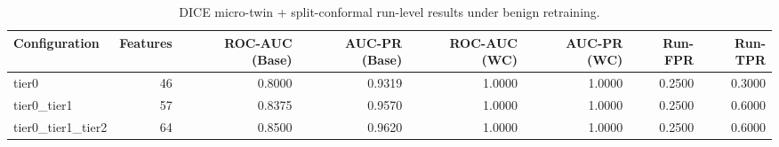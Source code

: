\begin{table}[t]
\centering
\caption{DICE micro-twin + split-conformal run-level results under benign retraining.}
\label{tab:dice_full_overall}
\footnotesize
\begin{tabular}{lrrrrrrr}
\toprule
Configuration & Features & ROC-AUC (Base) & AUC-PR (Base) & ROC-AUC (WC) & AUC-PR (WC) & Run-FPR & Run-TPR \\
\midrule
tier0 & 46 & 0.8000 & 0.9319 & 1.0000 & 1.0000 & 0.2500 & 0.3000 \\
tier0_tier1 & 57 & 0.8375 & 0.9570 & 1.0000 & 1.0000 & 0.2500 & 0.6000 \\
tier0_tier1_tier2 & 64 & 0.8500 & 0.9620 & 1.0000 & 1.0000 & 0.2500 & 0.6000 \\
\bottomrule
\end{tabular}

\end{table}
